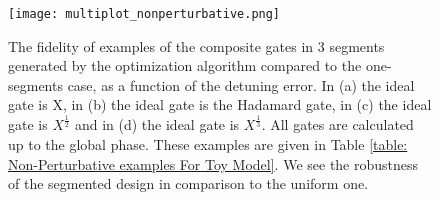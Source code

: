 \documentclass[floatfix,reprint, amsmath,amssymb,aps,superscriptaddress,nofootinbib]{revtex4-2}
\begin{document}
\begin{table}[tb]
\centering
{}
  \caption{Examples of non-perturbative solutions using the fully correlated detuning error model.}
  \label{table: Non-Perturbative examples For Toy Model}
\end{table}



\begin{figure}[htbp]{}
         \centering
         \texttt{[image: multiplot\_nonperturbative.png]}
         \caption{
         The fidelity of examples of the composite gates in 3 segments generated by the optimization algorithm compared to the one-segments case, as a function of the detuning error. In (a) the ideal gate is X, in (b) the ideal gate is the Hadamard gate, in (c) the ideal gate is $X^{\frac{1}{2}}$ and in (d) the ideal gate is $X^{\frac{1}{3}}$. All gates are calculated up to the global phase. These examples are given in Table \ref{table: Non-Perturbative examples For Toy Model}. We see the robustness of the segmented design in comparison to the uniform one.}
         \label{fig: Non Perturbative For Toy Model}
\end{figure}
\newpage
\end{document}
